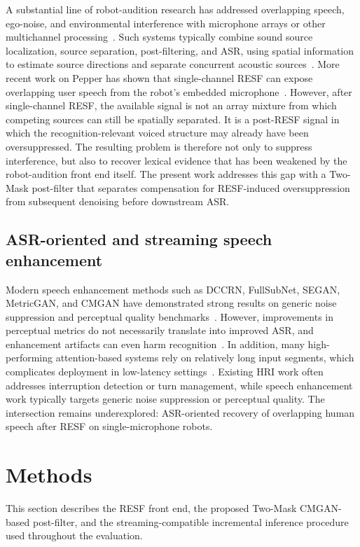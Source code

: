 \documentclass[manuscript,screen,review]{acmart}
\begin{document}
A substantial line of robot-audition research has addressed overlapping speech, ego-noise, and environmental interference with microphone arrays or other multichannel processing~\cite{10096344}. Such systems typically combine sound source localization, source separation, post-filtering, and ASR, using spatial information to estimate source directions and separate concurrent acoustic sources~\cite{nakadai2012robot}. More recent work on Pepper has shown that single-channel RESF can expose overlapping user speech from the robot's embedded microphone~\cite{Li_2024,li2024near}. However, after single-channel RESF, the available signal is not an array mixture from which competing sources can still be spatially separated. It is a post-RESF signal in which the recognition-relevant voiced structure may already have been oversuppressed. The resulting problem is therefore not only to suppress interference, but also to recover lexical evidence that has been weakened by the robot-audition front end itself. The present work addresses this gap with a Two-Mask post-filter that separates compensation for RESF-induced oversuppression from subsequent denoising before downstream ASR.
\subsection{ASR-oriented and streaming speech enhancement}
Modern speech enhancement methods such as DCCRN, FullSubNet, SEGAN, MetricGAN, and CMGAN have demonstrated strong results on generic noise suppression and perceptual quality benchmarks~\cite{hu2020dccrn,hao2021fullsubnet,pascual2017segan,fu2019metricgan,cao2022cmgan}. However, improvements in perceptual metrics do not necessarily translate into improved ASR, and enhancement artifacts can even harm recognition~\cite{Donahue2018,iwamoto2022bad,braun2022effect,ristea2024icassp}. In addition, many high-performing attention-based systems rely on relatively long input segments, which complicates deployment in low-latency settings~\cite{fan2022real,drgas2023survey}. Existing HRI work often addresses interruption detection or turn management, while speech enhancement work typically targets generic noise suppression or perceptual quality. The intersection remains underexplored: ASR-oriented recovery of overlapping human speech after RESF on single-microphone robots.

\section{Methods}
\label{Method:SS}
This section describes the RESF front end, the proposed Two-Mask CMGAN-based post-filter, and the streaming-compatible incremental inference procedure used throughout the evaluation.
\end{document}
